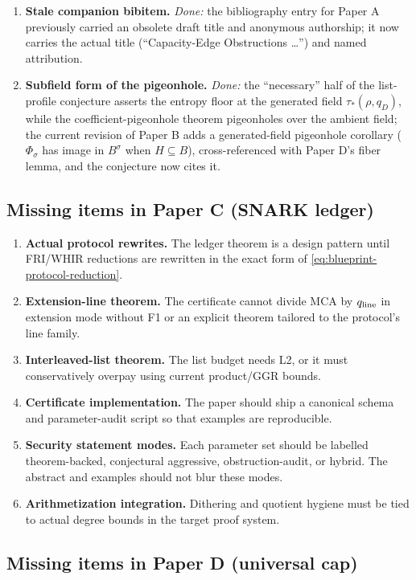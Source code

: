 \documentclass[11pt]{article}
\theoremstyle{definition}
\theoremstyle{remark}
\newcommand{\qline}{q_{\rm line}}
\newcommand{\taustar}{\tau_*}
\newcommand{\paperA}{Paper A}
\newcommand{\paperB}{Paper B}
\newcommand{\paperC}{Paper C}
\newcommand{\paperD}{Paper D}
\begin{document}
\begin{enumerate}[label=B\arabic*.,leftmargin=2.2em]
\item \textbf{Stale companion bibitem.}  \emph{Done:} the bibliography entry for \paperA{} previously carried an obsolete draft title and anonymous authorship; it now carries the actual title (``Capacity-Edge Obstructions \ldots'') and named attribution.
\item \textbf{Subfield form of the pigeonhole.}  \emph{Done:} the ``necessary'' half of the list-profile conjecture asserts the entropy floor at the generated field $\taustar(\rho,q_D)$, while the coefficient-pigeonhole theorem pigeonholes over the ambient field; the current revision of \paperB{} adds a generated-field pigeonhole corollary ($\Phi_\sigma$ has image in $B^\sigma$ when $H\subseteq B$), cross-referenced with \paperD's fiber lemma, and the conjecture now cites it.
\end{enumerate}

\subsection{Missing items in \paperC{} (SNARK ledger)}

\begin{enumerate}[label=C\arabic*.,leftmargin=2.2em]
\item \textbf{Actual protocol rewrites.}  The ledger theorem is a design pattern until FRI/WHIR reductions are rewritten in the exact form of \eqref{eq:blueprint-protocol-reduction}.
\item \textbf{Extension-line theorem.}  The certificate cannot divide MCA by $\qline$ in extension mode without F1 or an explicit theorem tailored to the protocol's line family.
\item \textbf{Interleaved-list theorem.}  The list budget needs L2, or it must conservatively overpay using current product/GGR bounds.
\item \textbf{Certificate implementation.}  The paper should ship a canonical schema and parameter-audit script so that examples are reproducible.
\item \textbf{Security statement modes.}  Each parameter set should be labelled theorem-backed, conjectural aggressive, obstruction-audit, or hybrid.  The abstract and examples should not blur these modes.
\item \textbf{Arithmetization integration.}  Dithering and quotient hygiene must be tied to actual degree bounds in the target proof system.
\end{enumerate}

\subsection{Missing items in \paperD{} (universal cap)}
\end{document}

